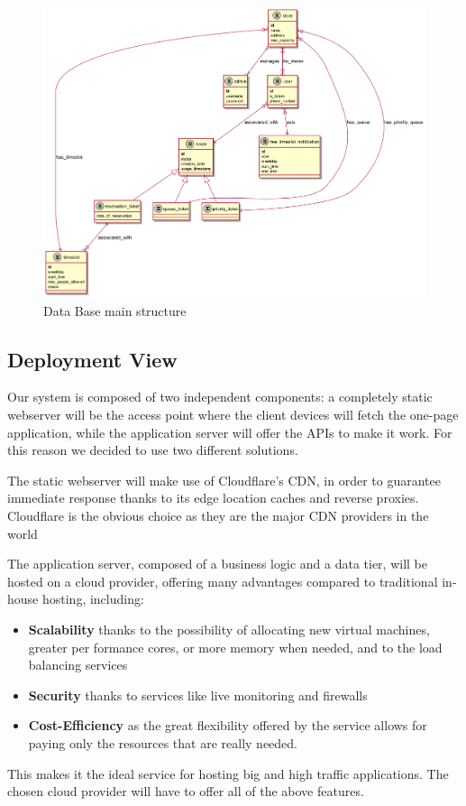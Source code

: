 \begin{figure}[H]
    \includegraphics[width=\linewidth]{uml/db_structure.png}
    \caption{Data Base main structure}
    \label{fig:db_structure}
\end{figure}




\subsection{Deployment View}
Our system is composed of two independent components: a completely static webserver will be the access point where the client devices will fetch the one-page application, while the application server will offer the APIs to make it work.
For this reason we decided to use two different solutions.

The static webserver will make use of Cloudflare's CDN, in order to guarantee immediate response thanks to its edge location caches and reverse proxies. Cloudflare is the obvious choice as they are the major CDN providers in the world

The application server, composed of a business logic and a data tier, will be hosted on a cloud provider, offering many advantages compared to traditional in-house hosting, including:
\begin{itemize}
    \item \textbf{Scalability} thanks to the possibility of allocating new virtual machines, greater per formance cores, or more memory when needed, and to the load balancing services
    \item \textbf{Security} thanks to services like live monitoring and firewalls
    \item \textbf{Cost-Efficiency} as the great flexibility offered by the service allows for paying only the resources that are really needed.
\end{itemize}
This makes it the ideal service for hosting big and high traffic applications. The chosen cloud provider will have to offer all of the above features.

